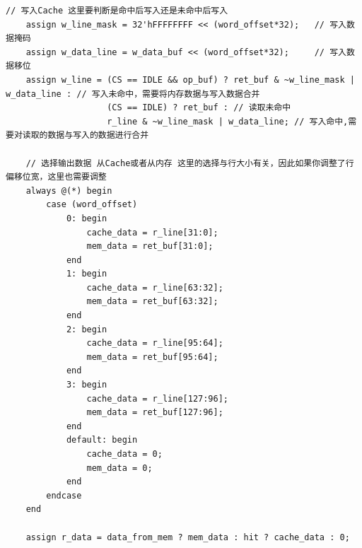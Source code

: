 \documentclass[12pt,a4paper]{ctexart}
\begin{document}
\begin{lstlisting}[style=verilog]
    // 写入Cache 这里要判断是命中后写入还是未命中后写入
    assign w_line_mask = 32'hFFFFFFFF << (word_offset*32);   // 写入数据掩码
    assign w_data_line = w_data_buf << (word_offset*32);     // 写入数据移位
    assign w_line = (CS == IDLE && op_buf) ? ret_buf & ~w_line_mask | w_data_line : // 写入未命中，需要将内存数据与写入数据合并
                    (CS == IDLE) ? ret_buf : // 读取未命中
                    r_line & ~w_line_mask | w_data_line; // 写入命中,需要对读取的数据与写入的数据进行合并

    // 选择输出数据 从Cache或者从内存 这里的选择与行大小有关，因此如果你调整了行偏移位宽，这里也需要调整
    always @(*) begin
        case (word_offset)
            0: begin
                cache_data = r_line[31:0];
                mem_data = ret_buf[31:0];
            end
            1: begin
                cache_data = r_line[63:32];
                mem_data = ret_buf[63:32];
            end
            2: begin
                cache_data = r_line[95:64];
                mem_data = ret_buf[95:64];
            end
            3: begin
                cache_data = r_line[127:96];
                mem_data = ret_buf[127:96];
            end
            default: begin
                cache_data = 0;
                mem_data = 0;
            end
        endcase
    end

    assign r_data = data_from_mem ? mem_data : hit ? cache_data : 0;


\end{lstlisting}
\end{document}
